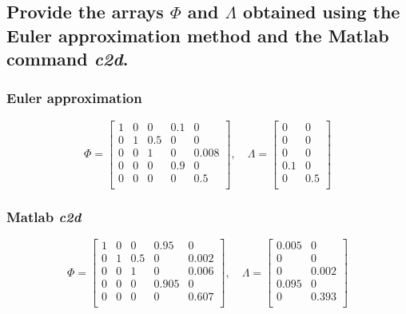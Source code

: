 \subsection{Provide the arrays $\Phi$ and $\Lambda$ obtained using the Euler approximation method and the Matlab command \textit{c2d}.}
\subsubsection*{Euler approximation}
\begin{equation}
    \Phi = 
    \left[ {\begin{array}{ccccc}
        1 &0 &0   &0.1 &0     \\
        0 &1 &0.5 &0   &0     \\
        0 &0 &1   &0   &0.008 \\
        0 &0 &0   &0.9 &0     \\
        0 &0 &0   &0   &0.5   \\
    \end{array} } \right]    
    ,\quad
    \Lambda =
    \left[ {\begin{array}{cc}
        0 &0\\
        0 &0\\
        0 &0\\
        0.1 &0\\
        0 &0.5\\
    \end{array} } \right]
\end{equation}

\subsubsection*{Matlab \textit{c2d}}
\begin{equation}
    \Phi = 
    \left[ {\begin{array}{ccccc}
        1 &0 &0   &0.95  &0     \\
        0 &1 &0.5 &0     &0.002     \\
        0 &0 &1   &0     &0.006 \\
        0 &0 &0   &0.905 &0     \\
        0 &0 &0   &0     &0.607   \\
    \end{array} } \right]    
    ,\quad
    \Lambda =
    \left[ {\begin{array}{cc}
        0.005 &0\\
        0 &0\\
        0 &0.002\\
        0.095 &0\\
        0 &0.393\\
    \end{array} } \right]
\end{equation}



